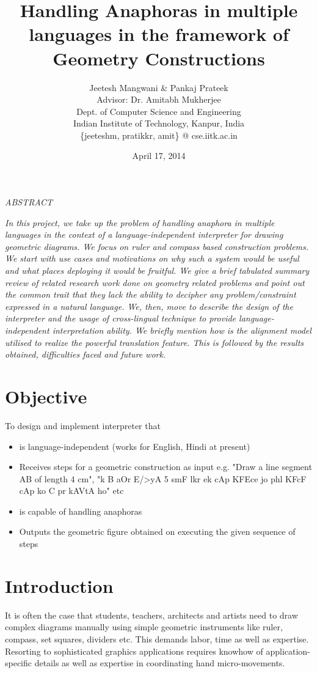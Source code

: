\def\DevnagVersion{2.15}\documentclass[12pt]{article}
\title{Handling Anaphoras in multiple languages in the framework of Geometry Constructions}
\author{Jeetesh Mangwani \& Pankaj Prateek\\
	Advisor: Dr. Amitabh Mukherjee\\
        Dept. of Computer Science and Engineering\\
	Indian Institute of Technology, Kanpur, India\\
	\{jeeteshm, pratikkr, amit\} @ cse.iitk.ac.in}
\date{April 17, 2014}
\begin{document}
\maketitle
\begin{center}{\b \em ABSTRACT}\end{center}
{\em In this project, we take up the problem of handling anaphora in multiple languages in the context of a language-independent interpreter for drawing geometric diagrams. We focus on ruler and compass based construction problems. We start with use cases and motivations on why such a system would be useful and what places deploying it would be fruitful. We give a brief tabulated summary review of related research work done on geometry related problems and point out the common trait that they lack the ability to decipher any problem/constraint expressed in a natural language. We, then, move to describe the design of the interpreter and the usage of cross-lingual technique to provide language-independent interpretation ability. We briefly mention how is the alignment model utilised to realize the powerful translation feature. This is followed by the results obtained, difficulties faced and future work.}

\section{Objective}
To design and implement interpreter that
\begin{itemize}
	\item is language-independent (works for English, Hindi at present)
	\item Receives steps for a geometric construction as input e.g. "Draw a line segment AB of length 4 cm", "{\dn k\?{\qva}} B {\dn aOr E/>yA} 5 {\dn s\?mF l\?kr ek cAp KF{\qva}Ece jo phl\? KF{\qva}cF cAp ko} C {\dn pr kAVtA ho}" etc
  \item is capable of handling anaphoras  
	\item Outputs the geometric figure obtained on executing the given sequence of steps 
\end{itemize}

\section{Introduction}
It is often the case that students, teachers, architects and artists need to draw complex diagrams manually using simple geometric instruments like ruler, compass, set squares, dividers etc. This demands labor, time as well as expertise. Resorting to sophisticated graphics applications requires knowhow of application-specific details as well as expertise in coordinating hand micro-movements.\\
\end{document}
